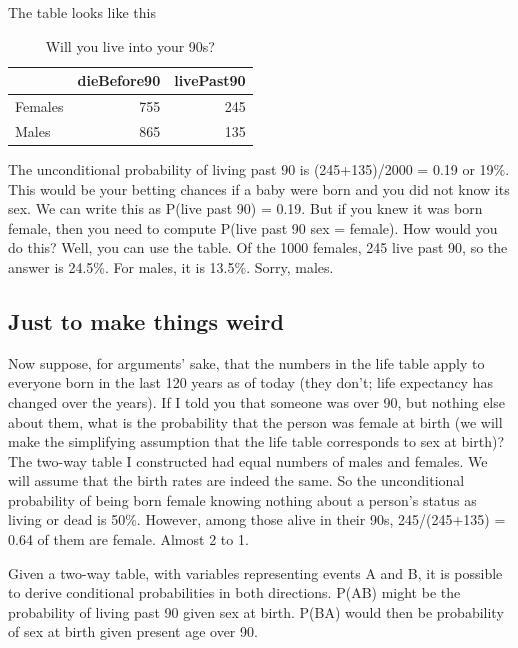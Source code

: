 \documentclass[openany]{book}
\begin{document}
The table looks like this

\begin{table}[!h]

\caption{\label{tab:unnamed-chunk-19}Will you live into your 90s?}
\centering
\begin{tabular}[t]{lrr}
\toprule
  & dieBefore90 & livePast90\\
\midrule
Females & 755 & 245\\
Males & 865 & 135\\
\bottomrule
\end{tabular}
\end{table}

The unconditional probability of living past 90 is (245+135)/2000 = 0.19 or 19\%. This would be your betting chances if a baby were born and you did not know its sex. We can write this as P(live past 90) = 0.19. But if you knew it was born female, then you need to compute P(live past 90 \textbar{} sex = female). How would you do this? Well, you can use the table. Of the 1000 females, 245 live past 90, so the answer is 24.5\%. For males, it is 13.5\%. Sorry, males.

\hypertarget{just-to-make-things-weird}{%
\subsection*{Just to make things weird}\label{just-to-make-things-weird}}

Now suppose, for arguments' sake, that the numbers in the life table apply to everyone born in the last 120 years as of today (they don't; life expectancy has changed over the years). If I told you that someone was over 90, but nothing else about them, what is the probability that the person was female at birth (we will make the simplifying assumption that the life table corresponds to sex at birth)? The two-way table I constructed had equal numbers of males and females. We will assume that the birth rates are indeed the same. So the unconditional probability of being born female knowing nothing about a person's status as living or dead is 50\%. However, among those alive in their 90s, 245/(245+135) = 0.64 of them are female. Almost 2 to 1.

Given a two-way table, with variables representing events A and B, it is possible to derive conditional probabilities in both directions. P(A\textbar{}B) might be the probability of living past 90 given sex at birth. P(B\textbar{}A) would then be probability of sex at birth given present age over 90.
\end{document}
